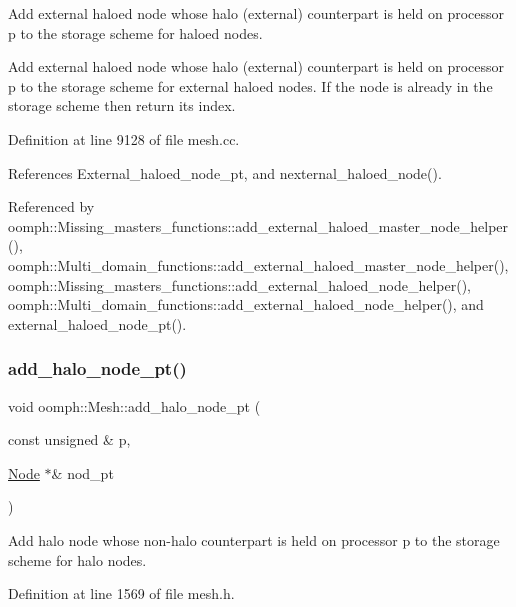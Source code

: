 Add external haloed node whose halo (external) counterpart is held on processor p to the storage scheme for haloed nodes. 

Add external haloed node whose halo (external) counterpart is held on processor p to the storage scheme for external haloed nodes. If the node is already in the storage scheme then return its index. 

Definition at line 9128 of file mesh.\+cc.



References External\+\_\+haloed\+\_\+node\+\_\+pt, and nexternal\+\_\+haloed\+\_\+node().



Referenced by oomph\+::\+Missing\+\_\+masters\+\_\+functions\+::add\+\_\+external\+\_\+haloed\+\_\+master\+\_\+node\+\_\+helper(), oomph\+::\+Multi\+\_\+domain\+\_\+functions\+::add\+\_\+external\+\_\+haloed\+\_\+master\+\_\+node\+\_\+helper(), oomph\+::\+Missing\+\_\+masters\+\_\+functions\+::add\+\_\+external\+\_\+haloed\+\_\+node\+\_\+helper(), oomph\+::\+Multi\+\_\+domain\+\_\+functions\+::add\+\_\+external\+\_\+haloed\+\_\+node\+\_\+helper(), and external\+\_\+haloed\+\_\+node\+\_\+pt().

\mbox{\label{classoomph_1_1Mesh_a2a707cd17908b06270d9169b3baa37d5}} 
\subsubsection{\texorpdfstring{add\+\_\+halo\+\_\+node\+\_\+pt()}{add\_halo\_node\_pt()}}
{\footnotesize\ttfamily void oomph\+::\+Mesh\+::add\+\_\+halo\+\_\+node\+\_\+pt (\begin{DoxyParamCaption}\item[{const unsigned \&}]{p,  }\item[{\hyperlink{classoomph_1_1Node}{Node} $\ast$\&}]{nod\+\_\+pt }\end{DoxyParamCaption})\hspace{0.3cm}{\ttfamily [inline]}}



Add halo node whose non-\/halo counterpart is held on processor p to the storage scheme for halo nodes. 



Definition at line 1569 of file mesh.\+h.



